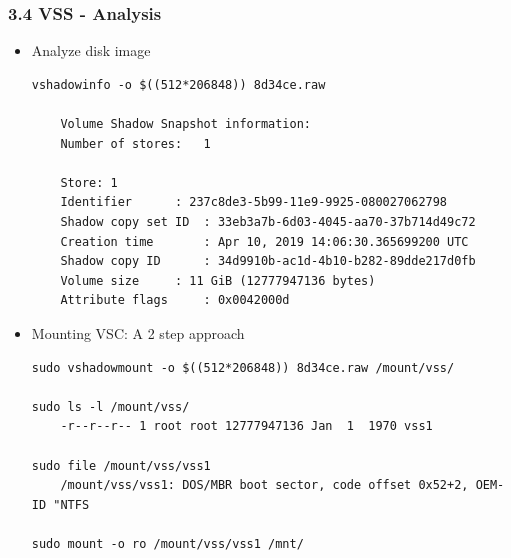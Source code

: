 \begin{frame}[fragile]
  \frametitle{3.4 VSS - Analysis}
    \begin{itemize}
	    \item[] Analyze disk image
  \begin{lstlisting}[basicstyle=\tiny]
vshadowinfo -o $((512*206848)) 8d34ce.raw 

    Volume Shadow Snapshot information:
	Number of stores:	1

    Store: 1
	Identifier		: 237c8de3-5b99-11e9-9925-080027062798
	Shadow copy set ID	: 33eb3a7b-6d03-4045-aa70-37b714d49c72
	Creation time		: Apr 10, 2019 14:06:30.365699200 UTC
	Shadow copy ID		: 34d9910b-ac1d-4b10-b282-89dde217d0fb
	Volume size		: 11 GiB (12777947136 bytes)
	Attribute flags		: 0x0042000d
  \end{lstlisting}
	    \item[] Mounting VSC: A 2 step approach
  \begin{lstlisting}[basicstyle=\tiny]
sudo vshadowmount -o $((512*206848)) 8d34ce.raw /mount/vss/

sudo ls -l /mount/vss/
	-r--r--r-- 1 root root 12777947136 Jan  1  1970 vss1

sudo file /mount/vss/vss1
	/mount/vss/vss1: DOS/MBR boot sector, code offset 0x52+2, OEM-ID "NTFS 

sudo mount -o ro /mount/vss/vss1 /mnt/
  \end{lstlisting}
  \end{itemize}
\end{frame}


